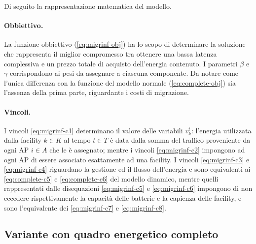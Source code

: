Di seguito la rappresentazione matematica del modello.



\paragraph*{Obbiettivo.}

La funzione obbiettivo (\ref{eq:migrinf-obj}) ha lo scopo di determinare la soluzione che rappresenta il miglior compromesso tra ottenere una bassa latenza complessiva e un prezzo totale di acquisto dell'energia contenuto. I parametri $\beta$ e $\gamma$ corrispondono ai pesi da assegnare a ciascuna componente. Da notare come l'unica differenza con la funzione del modello normale (\ref{eq:complete-obj}) sia l'assenza della prima parte, riguardante i costi di migrazione.

\paragraph*{Vincoli.}

I vincoli \ref{eq:migrinf-c1} determinano il valore delle variabili $v^t_k$: l'energia utilizzata dalla facility $k \in K$ al tempo $t \in T$ è data dalla somma del traffico proveniente da ogni AP $i \in A$ che le è assegnato; mentre i vincoli \ref{eq:migrinf-c2} impongono ad ogni AP di essere associato esattamente ad una facility. I vincoli \ref{eq:migrinf-c3} e \ref{eq:migrinf-c4} riguardano la gestione ed il flusso dell'energia e sono equivalenti ai \ref{eq:complete-c5} e \ref{eq:complete-c6} del modello dinamico, mentre quelli rappresentati dalle disequazioni \ref{eq:migrinf-c5} e \ref{eq:migrinf-c6} impongono di non eccedere rispettivamente la capacità delle batterie e la capienza delle facility, e sono l'equivalente dei \ref{eq:migrinf-c7} e \ref{eq:migrinf-c8}.


\subsection{Variante con quadro energetico completo}

